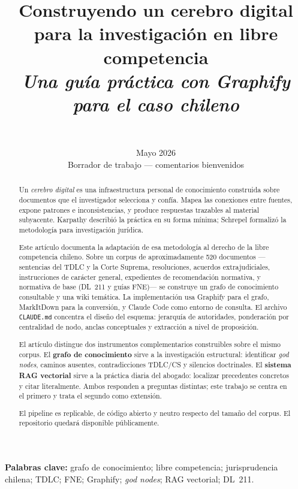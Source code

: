 \documentclass[12pt,a4paper]{article}
\title{%
  \textbf{Construyendo un cerebro digital\\
  para la investigación en libre competencia}\\[0.4em]
  \large\textit{Una guía práctica con Graphify para el caso chileno}
}
\author{%
  \pend{Nombre del autor y afiliación}\\[0.3em]
  \small \texttt{\pend{correo electrónico}}
}
\date{Mayo 2026\\[0.5em]
  \small Borrador de trabajo — comentarios bienvenidos}
\begin{document}

\maketitle
\thispagestyle{empty}

\begin{abstract}
\noindent
Un \emph{cerebro digital} es una infraestructura personal de conocimiento
construida sobre documentos que el investigador selecciona y confía. Mapea las
conexiones entre fuentes, expone patrones e inconsistencias, y produce respuestas
trazables al material subyacente. Karpathy describió la práctica en su forma
mínima; Schrepel formalizó la metodología para investigación
jurídica.\autocite{schrepel2026brain}

Este artículo documenta la adaptación de esa metodología al derecho de la libre
competencia chileno. Sobre un corpus de aproximadamente 520 documentos
—sentencias del TDLC y la Corte Suprema, resoluciones, acuerdos extrajudiciales,
instrucciones de carácter general, expedientes de recomendación normativa, y
normativa de base (DL~211 y guías FNE)— se construye un grafo de conocimiento
consultable y una wiki temática. La implementación usa Graphify\autocite{shamsi2025graphify}
para el grafo, MarkItDown\autocite{microsoft2024markitdown} para la conversión, y
Claude Code como entorno de consulta. El archivo \texttt{CLAUDE.md} concentra el
diseño del esquema: jerarquía de autoridades, ponderación por centralidad de nodo,
anclas conceptuales y extracción a nivel de proposición.

El artículo distingue dos instrumentos complementarios construibles sobre el
mismo corpus. El \textbf{grafo de conocimiento} sirve a la investigación
estructural: identificar \emph{god nodes}, caminos ausentes, contradicciones
TDLC/CS y silencios doctrinales. El \textbf{sistema RAG vectorial} sirve a la
práctica diaria del abogado: localizar precedentes concretos y citar
literalmente. Ambos responden a preguntas distintas; este trabajo se centra en el
primero y trata el segundo como extensión.

El pipeline es replicable, de código abierto y neutro respecto del tamaño del
corpus. El repositorio quedará disponible públicamente.
\end{abstract}

\vspace{1em}
\noindent\textbf{Palabras clave:} grafo de conocimiento; libre competencia;
jurisprudencia chilena; TDLC; FNE; Graphify; \emph{god nodes}; RAG vectorial;
DL~211.
\end{document}
